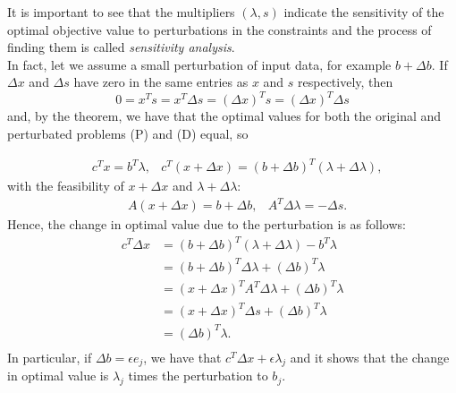 \documentclass[a4paper,10 pt,titlepage,twoside]{book}
\theoremstyle{plain}
\theoremstyle{definition}
\theoremstyle{remark}
\begin{document}
It is important to see that the multipliers $(\lambda,s)$ indicate the sensitivity of the optimal objective value to perturbations in the constraints and the process of finding them is called \textit{sensitivity analysis}. \\ In fact, let we assume a small perturbation of input data, for example $b + \Delta b$. If $\Delta x$ and $\Delta s$ have zero in the same entries as $x$ and $s$ respectively, then
\begin{equation*}
0=x^{T}s=x^{T}\Delta s= \left( \Delta x\right)^{T}s=\left( \Delta x\right)^{T}\Delta s
\end{equation*}
and, by the theorem, we have that the optimal values for both the original and perturbated problems (P) and (D) equal, so

\begin{align*}
&c^{T}x=b^{T}\lambda,  &c^{T}(x + \Delta x)=\left(b+\Delta b\right)^{T}\left(\lambda+\Delta \lambda\right),
\end{align*}
with the feasibility of $x + \Delta x$ and $\lambda+\Delta \lambda$:
\begin{align*}
&A(x + \Delta x)=b+\Delta b,
&A^{T}\Delta\lambda=-\Delta s.
\end{align*}
Hence, the change in optimal value due to the perturbation is as follows:
\begin{align*}
c^{T}\Delta x&=\left(b+\Delta b\right)^{T}\left(\lambda+\Delta \lambda\right) - b^{T}\lambda\\
&=\left(b+\Delta b\right)^{T}\Delta \lambda+\left(\Delta b\right)^{T}\lambda\\
&=\left(x+\Delta x\right)^{T}A^{T}\Delta \lambda+\left(\Delta b\right)^{T}\lambda\\
&=\left(x+\Delta x\right)^{T}\Delta s+\left(\Delta b\right)^{T}\lambda\\
&=\left(\Delta b\right)^{T}\lambda.\\
\end{align*} 
In particular, if $\Delta b = \epsilon e_{j}$, we have that $c^{T}\Delta x+\epsilon \lambda_{j}$ and it shows that the change in optimal value is $\lambda_{j}$ times the perturbation to $b_{j}$.

%
%
\end{document}
